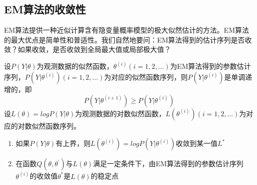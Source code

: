 \subsection*{EM算法的收敛性}
EM算法提供一种近似计算含有隐变量概率模型的极大似然估计的方法。EM算法的最大优点是简单性和普适性。我们自然地要问：EM算法得到的估计序列是否收敛？如果收敛，是否收敛到全局最大值或局部极大值？
\begin{theorem}{}{}
	设$P(Y|\theta)$为观测数据的似然函数，$\theta^{(i)}(i=1,2,\dots)$为EM算法得到的参数估计序列，$P(Y|\theta^{(i)})(i=1,2,\dots)$为对应的似然函数序列，则$P(Y|\theta^{(i)})$是单调递增的，即
	\begin{equation}
		P(Y|\theta^{(i+1)})\geqslant P(Y|\theta^{(i)})
	\end{equation}
	设$L(\theta)=logP(Y|\theta)$为观测数据的对数似然函数，$L(\theta^{(i)})(i=1,2,\dots)$为对应的对数似然函数序列。
	\begin{enumerate}
		\item 如果$P(Y|\theta)$有上界，则$L(\theta^{(i)})=logP(Y|\theta^{(i)})$收敛到某一值$L^*$
		\item 在函数$Q(\theta,\theta^{'})$与$L(\theta)$满足一定条件下，由EM算法得到的参数估计序列$\theta^{(i)}$的收敛值$\theta^*$是$L(\theta)$的稳定点
	\end{enumerate}
\end{theorem}

